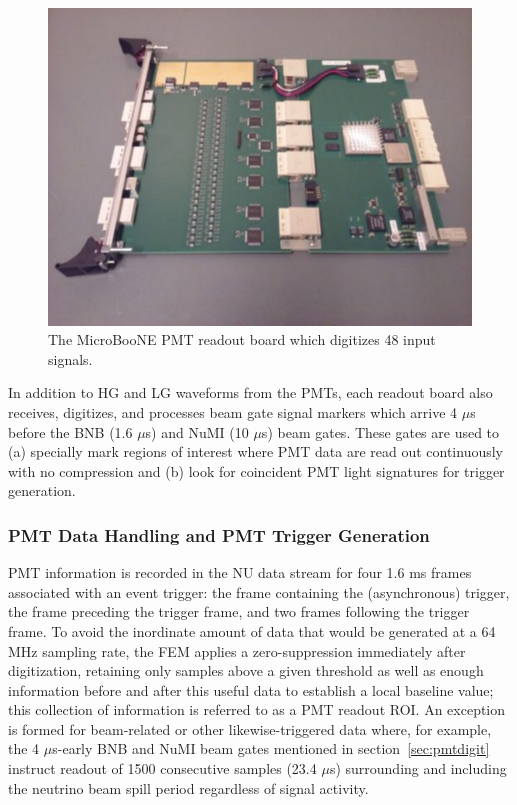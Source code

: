 \begin{figure}
\centering
\includegraphics[width=0.8\linewidth]{./figures/PMTshaper.pdf}%
\caption{\label{fig:readout_8}The MicroBooNE PMT readout board which digitizes 48 input signals.}
\end{figure}

In addition to HG and LG waveforms from the PMTs, each readout board also receives, digitizes, and processes beam gate signal markers which arrive 4 $\mu$s before the BNB (1.6 $\mu$s) and NuMI (10 $\mu$s) beam gates. These gates are used to (a) specially mark regions of interest where PMT data are read out continuously with no compression and (b) look for coincident PMT light signatures for trigger generation. 

\subsubsection{PMT Data Handling and PMT Trigger Generation}
\label{tpcfem}

PMT information is recorded in the NU data stream for four 1.6 ms frames associated with an event trigger: the frame containing the (asynchronous) trigger, the frame preceding the trigger frame, and two frames following the trigger frame. To avoid the inordinate amount of data that would be generated at a 64 MHz sampling rate, the FEM applies a zero-suppression immediately after digitization, retaining only samples above a given threshold as well as enough information before and after this useful data to establish a local baseline value; this collection of information is referred to as a PMT readout ROI. An exception is formed for beam-related or other likewise-triggered data where, for example,  the 4 $\mu$s-early BNB and NuMI beam gates mentioned in section~\ref{sec:pmtdigit} instruct readout of 1500 consecutive samples (23.4 $\mu$s) surrounding and including the neutrino beam spill period regardless of signal activity.

